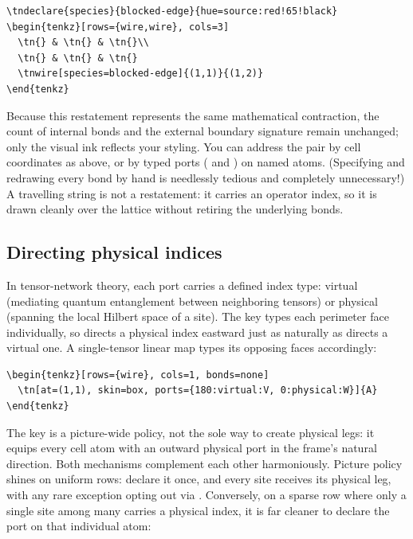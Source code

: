 \begin{Verbatim}[fontsize=\small,frame=leftline]
\tndeclare{species}{blocked-edge}{hue=source:red!65!black}
\begin{tenkz}[rows={wire,wire}, cols=3]
  \tn{} & \tn{} & \tn{}\\
  \tn{} & \tn{} & \tn{}
  \tnwire[species=blocked-edge]{(1,1)}{(1,2)}
\end{tenkz}
\end{Verbatim}

Because this restatement represents the same mathematical contraction, the
count of internal bonds and the external boundary signature remain unchanged;
only the visual ink reflects your styling.  You can address the pair by cell
coordinates as above, or by typed ports ( and ) on
named atoms.  (Specifying  and redrawing every bond by hand is
needlessly tedious and completely unnecessary!)  A travelling string is not a
restatement: it carries an operator index, so it is drawn cleanly over the
lattice without retiring the underlying bonds.

\subsection{Directing physical indices}

In tensor-network theory, each port carries a defined index type: virtual
(mediating quantum entanglement between neighboring tensors) or physical
(spanning the local Hilbert space of a site).  The  key types
each perimeter face individually, so  directs a physical
index eastward just as naturally as  directs a virtual one.  A
single-tensor linear map types its opposing faces accordingly:

\begin{Verbatim}[fontsize=\small,frame=leftline]
\begin{tenkz}[rows={wire}, cols=1, bonds=none]
  \tn[at=(1,1), skin=box, ports={180:virtual:V, 0:physical:W}]{A}
\end{tenkz}
\end{Verbatim}

The  key is a picture-wide policy, not the sole way to create
physical legs: it equips every cell atom with an outward physical port in the
frame's natural direction.  Both mechanisms complement each other harmoniously.
Picture policy shines on uniform rows: declare it once, and every site receives
its physical leg, with any rare exception opting out via .
Conversely, on a sparse row where only a single site among many carries a
physical index, it is far cleaner to declare the port on that individual atom:

